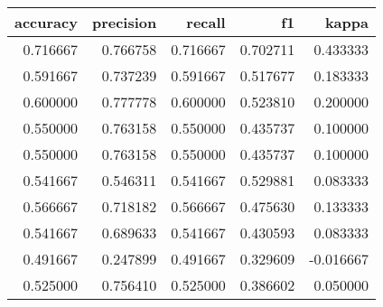 \begin{tabular}{rrrrr}
\toprule
accuracy & precision & recall & f1 & kappa \\
\midrule
0.716667 & 0.766758 & 0.716667 & 0.702711 & 0.433333 \\
0.591667 & 0.737239 & 0.591667 & 0.517677 & 0.183333 \\
0.600000 & 0.777778 & 0.600000 & 0.523810 & 0.200000 \\
0.550000 & 0.763158 & 0.550000 & 0.435737 & 0.100000 \\
0.550000 & 0.763158 & 0.550000 & 0.435737 & 0.100000 \\
0.541667 & 0.546311 & 0.541667 & 0.529881 & 0.083333 \\
0.566667 & 0.718182 & 0.566667 & 0.475630 & 0.133333 \\
0.541667 & 0.689633 & 0.541667 & 0.430593 & 0.083333 \\
0.491667 & 0.247899 & 0.491667 & 0.329609 & -0.016667 \\
0.525000 & 0.756410 & 0.525000 & 0.386602 & 0.050000 \\
\bottomrule
\end{tabular}
